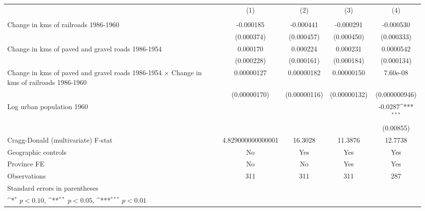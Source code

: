 {
\def\sym#1{\ifmmode^{#1}\else\(^{#1}\)\fi}
\begin{tabular}{l*{4}{c}}
\hline\hline
                &\multicolumn{1}{c}{(1)}&\multicolumn{1}{c}{(2)}&\multicolumn{1}{c}{(3)}&\multicolumn{1}{c}{(4)}\\
                &\multicolumn{1}{c}{}&\multicolumn{1}{c}{}&\multicolumn{1}{c}{}&\multicolumn{1}{c}{}\\
\hline
Change in kms of railroads 1986-1960&-0.000185         &-0.000441         &-0.000291         &-0.000530         \\
                &(0.000374)         &(0.000457)         &(0.000450)         &(0.000333)         \\
[1em]
Change in kms of paved and gravel roads 1986-1954& 0.000170         & 0.000224         & 0.000231         &0.0000542         \\
                &(0.000228)         &(0.000161)         &(0.000184)         &(0.000134)         \\
[1em]
Change in kms of paved and gravel roads 1986-1954 $\times$ Change in kms of railroads 1986-1960&0.00000127         &0.00000182         &0.00000150         & 7.60e-08         \\
                &(0.00000170)         &(0.00000116)         &(0.00000132)         &(0.000000946)         \\
[1em]
Log urban population 1960&                  &                  &                  &  -0.0287\sym{***}\\
                &                  &                  &                  &(0.00855)         \\
\hline
Cragg-Donald (multivariate) F-stat&4.829000000000001         &  16.3028         &  11.3876         &  12.7738         \\
Geographic controls&       No         &      Yes         &      Yes         &      Yes         \\
Province FE     &       No         &       No         &      Yes         &      Yes         \\
Observations    &      311         &      311         &      311         &      287         \\
\hline\hline
\multicolumn{5}{l}{\footnotesize Standard errors in parentheses}\\
\multicolumn{5}{l}{\footnotesize \sym{*} \(p<0.10\), \sym{**} \(p<0.05\), \sym{***} \(p<0.01\)}\\
\end{tabular}
}
